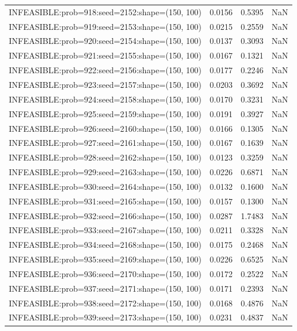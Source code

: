 \begin{longtable}{lccc}
INFEASIBLE:prob=918:seed=2152:shape=(150, 100) &   0.0156 &  0.5395 &    NaN \\
INFEASIBLE:prob=919:seed=2153:shape=(150, 100) &   0.0215 &  0.2559 &    NaN \\
INFEASIBLE:prob=920:seed=2154:shape=(150, 100) &   0.0137 &  0.3093 &    NaN \\
INFEASIBLE:prob=921:seed=2155:shape=(150, 100) &   0.0167 &  0.1321 &    NaN \\
INFEASIBLE:prob=922:seed=2156:shape=(150, 100) &   0.0177 &  0.2246 &    NaN \\
INFEASIBLE:prob=923:seed=2157:shape=(150, 100) &   0.0203 &  0.3692 &    NaN \\
INFEASIBLE:prob=924:seed=2158:shape=(150, 100) &   0.0170 &  0.3231 &    NaN \\
INFEASIBLE:prob=925:seed=2159:shape=(150, 100) &   0.0191 &  0.3927 &    NaN \\
INFEASIBLE:prob=926:seed=2160:shape=(150, 100) &   0.0166 &  0.1305 &    NaN \\
INFEASIBLE:prob=927:seed=2161:shape=(150, 100) &   0.0167 &  0.1639 &    NaN \\
INFEASIBLE:prob=928:seed=2162:shape=(150, 100) &   0.0123 &  0.3259 &    NaN \\
INFEASIBLE:prob=929:seed=2163:shape=(150, 100) &   0.0226 &  0.6871 &    NaN \\
INFEASIBLE:prob=930:seed=2164:shape=(150, 100) &   0.0132 &  0.1600 &    NaN \\
INFEASIBLE:prob=931:seed=2165:shape=(150, 100) &   0.0157 &  0.1300 &    NaN \\
INFEASIBLE:prob=932:seed=2166:shape=(150, 100) &   0.0287 &  1.7483 &    NaN \\
INFEASIBLE:prob=933:seed=2167:shape=(150, 100) &   0.0211 &  0.3328 &    NaN \\
INFEASIBLE:prob=934:seed=2168:shape=(150, 100) &   0.0175 &  0.2468 &    NaN \\
INFEASIBLE:prob=935:seed=2169:shape=(150, 100) &   0.0226 &  0.6525 &    NaN \\
INFEASIBLE:prob=936:seed=2170:shape=(150, 100) &   0.0172 &  0.2522 &    NaN \\
INFEASIBLE:prob=937:seed=2171:shape=(150, 100) &   0.0171 &  0.2393 &    NaN \\
INFEASIBLE:prob=938:seed=2172:shape=(150, 100) &   0.0168 &  0.4876 &    NaN \\
INFEASIBLE:prob=939:seed=2173:shape=(150, 100) &   0.0231 &  0.4837 &    NaN \\

\end{longtable}

